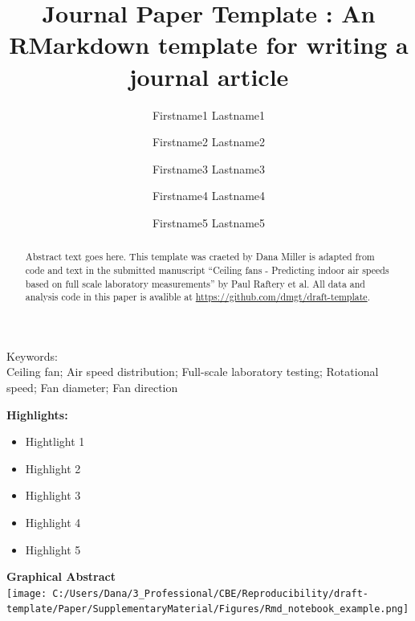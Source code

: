 \documentclass[]{elsarticle} %
\providecommand{\tightlist}{%
  \setlength{\itemsep}{0pt}\setlength{\parskip}{0pt}}
\begin{document}
\begin{frontmatter}

  \title{Journal Paper Template : An RMarkdown template for writing a journal
article}
    \author[CBE]{Firstname1 Lastname1}
    \author[Manufacturer]{Firstname2 Lastname2}
  
  
    \author[Visiting]{Firstname3 Lastname3}
  
  
    \author[CBE]{Firstname4 Lastname4}
  
  
    \author[Consultant]{Firstname5 Lastname5}
  
  
      \address[CBE]{Center for the Built Environment, UC Berkeley, 390 Wurster Hall,
Berkeley, CA, 94720, USA}
    \address[Manufacturer]{Collaborating Manufacturer, 1234 Innovation Dr, Lexington, KY 12345, USA}
    \address[Visiting]{Dept. of Environment Science and Engineering, Daxue University, 123
Xuexiao Road, Tianjin, 123456, China}
    \address[Consultant]{Consulting company, 123 54th St, Oakland, CA, 12345, USA}
  
  \begin{abstract}
  Abstract text goes here. This template was craeted by Dana Miller is
  adapted from code and text in the submitted manuscript ``Ceiling fans -
  Predicting indoor air speeds based on full scale laboratory
  measurements'' by Paul Raftery et al. All data and analysis code in this
  paper is avalible at \url{https://github.com/dmgt/draft-template}.
  \end{abstract}
  
 \end{frontmatter}

Keywords:\\
Ceiling fan; Air speed distribution; Full-scale laboratory testing;
Rotational speed; Fan diameter; Fan direction

\pagebreak

\textbf{Highlights:}

\begin{itemize}
\tightlist
\item
  Hightlight 1
\item
  Highlight 2
\item
  Highlight 3
\item
  Highlight 4
\item
  Highlight 5
\end{itemize}

\textbf{Graphical Abstract}\\
\texttt{[image: C:/Users/Dana/3\_Professional/CBE/Reproducibility/draft-template/Paper/SupplementaryMaterial/Figures/Rmd\_notebook\_example.png]}
\end{document}
